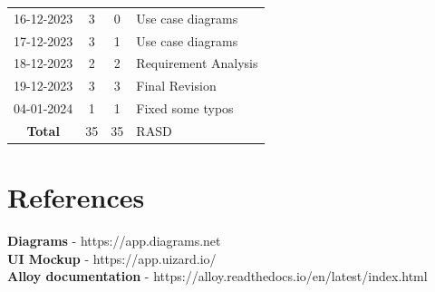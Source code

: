 \documentclass[12pt, a4paper]{report}
\begin{document}
\begin{table}[H]
\begin{tabular}{cccl}
            16-12-2023      & 3                         & 0                             & Use case diagrams                             \\
            17-12-2023      & 3                         & 1                             & Use case diagrams                             \\
            18-12-2023      & 2                         & 2                             & Requirement Analysis                          \\
            19-12-2023      & 3                         & 3                             & Final Revision                                \\ 
            04-01-2024      & 1                         & 1                             & Fixed some typos                              \\ \hline
            \textbf{Total}  & 35                        & 35                            & RASD                                          \\  
        \end{tabular}
    \end{table}

\chapter{References}
    \textbf{Diagrams} - https://app.diagrams.net \\
    \textbf{UI Mockup} - https://app.uizard.io/ \\
    \textbf{Alloy documentation} - https://alloy.readthedocs.io/en/latest/index.html
\end{document}
